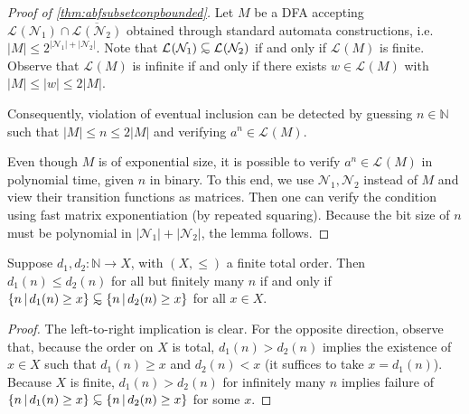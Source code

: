 \documentclass[10pt,a4paper]{amsart}
\numberwithin{equation}{section}
\theoremstyle{plain}
\theoremstyle{definition}
\theoremstyle{remark}
\newcommand\lng[2]{\mathcal{L}_{#1}(#2)}
\newcommand\dgf{d}
\newcommand\nfa{\mathcal{N}}
\newcommand\abfsubset{\mathrel{{\ooalign{\hss\raisebox{-0.6ex}{\small$\sim$}\hss\cr\raisebox{0.4ex}{$\subset$}}}}
}
\begin{document}
\begin{proof}[Proof of \cref{thm:abfsubsetconpbounded}]
Let $M$ be a DFA  accepting $\lng{}{\nfa_1} \cap \overline{\lng{}{{\nfa_2}}}$ obtained through standard automata constructions, i.e. $|M| \le 2^{|\nfa_1|+|\nfa_2|}$.
Note that $\lng{}{\nfa_1} \abfsubset \lng{}{\nfa_2}$ if and only if $\lng{}{M}$ is finite.
Observe that $\lng{}{M}$ is infinite if and only if there exists $w\in \lng{}{M}$ with $|M| \le |w| \le 2|M|$.

Consequently, violation of eventual inclusion can be detected by
guessing $n\in \mathbb{N}$ such that $|M|\le n \le 2|M|$ and
verifying $a^n \in \lng{}{M}$.

Even though $M$ is of exponential size, it is possible to verify
$a^{n} \in \lng{}{M}$ in polynomial time, given $n$ in binary.
To this end, we use $\nfa_1, \nfa_2$ instead of $M$ and view their transition functions as matrices.
Then one can verify the condition using fast matrix exponentiation (by repeated squaring).
Because the bit size of $n$ must be polynomial in $|\nfa_1|+|\nfa_2|$, the lemma follows.
\end{proof}

\begin{lem}\label{lem:ei}
Suppose $\dgf_1,\dgf_2: \mathbb{N} \to X$, with $(X,\le)$ a finite total order.
Then $\dgf_1(n)\le \dgf_2(n)$ for all but finitely many $n$ if and only if
$\{ n\,|\, \dgf_1(n) \ge x\} \abfsubset \{ n\,|\, \dgf_2(n)\ge x\}$ for all $x\in X$.
\end{lem}
\begin{proof} 
The left-to-right implication is clear. For the opposite direction, observe that, because the order on $X$ is total, $\dgf_1(n) > \dgf_2(n)$
implies the existence of $x\in X$ such that $\dgf_1(n) \ge x$ and $\dgf_2(n) < x$ (it suffices to take $x=\dgf_1(n)$).
Because $X$ is finite,  $\dgf_1(n)>\dgf_2(n)$ for infinitely many $n$ implies failure of $\{ n\,|\, \dgf_1(n) \ge x\} \abfsubset \{ n\,|\, \dgf_2(n)\ge x\}$ for some $x$.
\end{proof}
\end{document}
